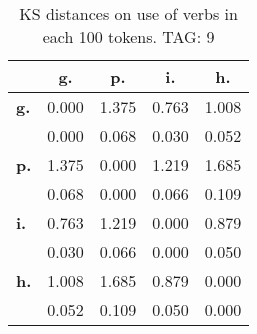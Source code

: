 \begin{table}[h!]
\begin{center}
\begin{tabular}{| l || c | c | c | c |}\hline
 & {\bf g.} & {\bf p.} & {\bf i.} & {\bf h.} \\\hline\hline
{\bf g.} & 0.000 & 1.375 & 0.763 & 1.008 \\
{\bf } & 0.000 & 0.068 & 0.030 & 0.052 \\\hline
{\bf p.} & 1.375 & 0.000 & 1.219 & 1.685 \\
{\bf } & 0.068 & 0.000 & 0.066 & 0.109 \\\hline
{\bf i.} & 0.763 & 1.219 & 0.000 & 0.879 \\
{\bf } & 0.030 & 0.066 & 0.000 & 0.050 \\\hline
{\bf h.} & 1.008 & 1.685 & 0.879 & 0.000 \\
{\bf } & 0.052 & 0.109 & 0.050 & 0.000 \\\hline
\end{tabular}
\caption{KS distances on use of verbs in each 100 tokens. TAG: 9}
\end{center}
\end{table}